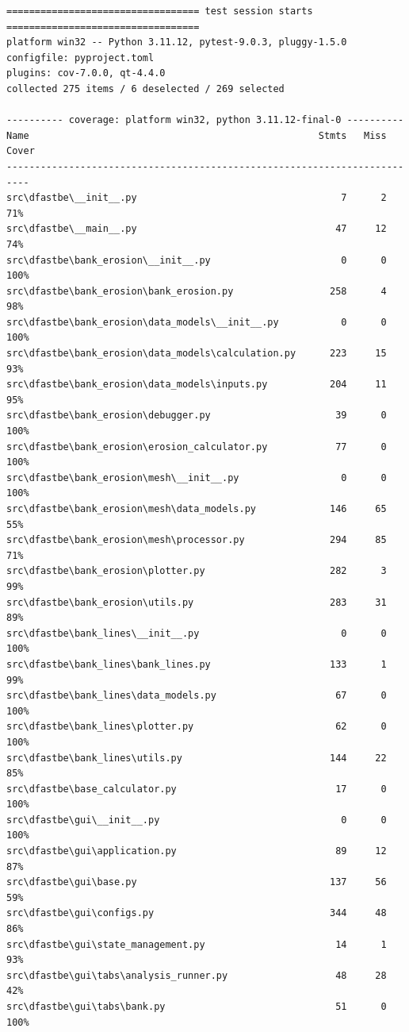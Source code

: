 \begin{Verbatim}[fontsize=\tiny]
================================== test session starts ==================================
platform win32 -- Python 3.11.12, pytest-9.0.3, pluggy-1.5.0
configfile: pyproject.toml
plugins: cov-7.0.0, qt-4.4.0
collected 275 items / 6 deselected / 269 selected

---------- coverage: platform win32, python 3.11.12-final-0 ----------
Name                                                   Stmts   Miss  Cover
--------------------------------------------------------------------------
src\dfastbe\__init__.py                                    7      2    71%
src\dfastbe\__main__.py                                   47     12    74%
src\dfastbe\bank_erosion\__init__.py                       0      0   100%
src\dfastbe\bank_erosion\bank_erosion.py                 258      4    98%
src\dfastbe\bank_erosion\data_models\__init__.py           0      0   100%
src\dfastbe\bank_erosion\data_models\calculation.py      223     15    93%
src\dfastbe\bank_erosion\data_models\inputs.py           204     11    95%
src\dfastbe\bank_erosion\debugger.py                      39      0   100%
src\dfastbe\bank_erosion\erosion_calculator.py            77      0   100%
src\dfastbe\bank_erosion\mesh\__init__.py                  0      0   100%
src\dfastbe\bank_erosion\mesh\data_models.py             146     65    55%
src\dfastbe\bank_erosion\mesh\processor.py               294     85    71%
src\dfastbe\bank_erosion\plotter.py                      282      3    99%
src\dfastbe\bank_erosion\utils.py                        283     31    89%
src\dfastbe\bank_lines\__init__.py                         0      0   100%
src\dfastbe\bank_lines\bank_lines.py                     133      1    99%
src\dfastbe\bank_lines\data_models.py                     67      0   100%
src\dfastbe\bank_lines\plotter.py                         62      0   100%
src\dfastbe\bank_lines\utils.py                          144     22    85%
src\dfastbe\base_calculator.py                            17      0   100%
src\dfastbe\gui\__init__.py                                0      0   100%
src\dfastbe\gui\application.py                            89     12    87%
src\dfastbe\gui\base.py                                  137     56    59%
src\dfastbe\gui\configs.py                               344     48    86%
src\dfastbe\gui\state_management.py                       14      1    93%
src\dfastbe\gui\tabs\analysis_runner.py                   48     28    42%
src\dfastbe\gui\tabs\bank.py                              51      0   100%

\end{Verbatim}
